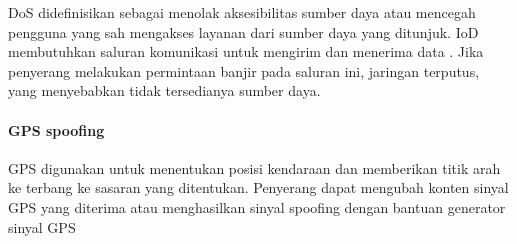 DoS didefinisikan sebagai menolak aksesibilitas sumber daya atau mencegah pengguna yang sah mengakses layanan dari sumber daya yang ditunjuk. IoD membutuhkan saluran komunikasi untuk mengirim dan menerima data \citep{rodday2016exploring}. Jika penyerang melakukan permintaan banjir pada saluran ini, jaringan terputus, yang menyebabkan tidak tersedianya sumber daya.

\paragraph{GPS spoofing}
\label{par:gpsspoofing}

GPS digunakan untuk menentukan posisi kendaraan dan memberikan titik arah ke terbang ke sasaran yang ditentukan. Penyerang dapat mengubah konten sinyal GPS yang diterima atau menghasilkan sinyal spoofing dengan bantuan generator sinyal GPS